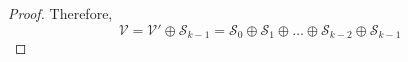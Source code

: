 \documentclass{article}
\theoremstyle{plain}
\newtheorem{lemma}[theorem]{Lemma}
\theoremstyle{definition}
\newcommand{\0}{\mathbf{0}}
\renewcommand{\vec}{\mathbf}
\newcommand{\vecspace}[1]{\mathcal{#1}}
\DeclareMathOperator{\extker}{extker}
\DeclareMathOperator{\id}{id}
\DeclareMathOperator{\img}{Im}
\DeclareMathOperator{\spec}{spec}
\begin{document}
\begin{proof}
    Therefore,
    \begin{equation*}
        \vecspace{V} = \vecspace{V}' \oplus \vecspace{S}_{k-1} = \vecspace{S}_0\oplus\vecspace{S}_1\oplus\dots\oplus\vecspace{S}_{k-2} \oplus \vecspace{S}_{k-1}
    \end{equation*}



\end{proof}

\end{document}
